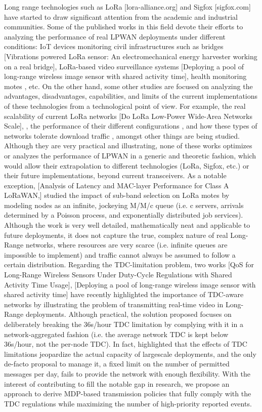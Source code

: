 Long range technologies such as LoRa [lora-alliance.org] and Sigfox [sigfox.com] have started to draw significant attention from the academic and industrial communities.
Some of the published works in this field devote their efforts to analyzing the performance of real LPWAN deployments under different conditions:
	IoT devices monitoring civil infrastructures such as bridges [Vibrations powered LoRa sensor:
	An electromechanical energy harvester working on a real bridge],
	LoRa-based video surveillance systems [Deploying a pool of long-range wireless image sensor with shared activity time],
	health monitoring motes \cite{petajajarvi_evaluation_2017},
	etc.
On the other hand,
	some other studies are focused on analyzing the advantages,
	disadvantages,
	capabilities,
	and limits of the current implementations of these technologies from a technological point of view.
For example,
	the real scalability of current LoRa networks [Do LoRa Low-Power Wide-Area Networks Scale],
	\cite{georgiou_low_2017},
	the performance of their different configurations \cite{bor_lora_2017},
	and how these types of networks tolerate download traffic \cite{pop_does_2017},
	amongst other things are being studied.
Although they are very practical and illustrating,
	none of these works optimizes or analyzes the performance of LPWAN in a generic and theoretic fashion,
	which would allow their extrapolation to different technologies (LoRa,
	Sigfox,
	etc.) or their future implementations,
	beyond current transceivers.
As a notable exception,
	[Analysis of Latency and MAC-layer Performance for Class A LoRaWAN,] studied the impact of sub-band selection on LoRa motes by modeling nodes as an infinite,
	jockeying M/M/c queue (i.e.
c servers,
	arrivals determined by a Poisson process,
	and exponentially distributed job services).
Although the work is very well detailed,
	mathematically neat and applicable to future deployments,
	it does not capture the true,
	complex nature of real Long-Range networks,
	where resources are very scarce (i.e.
infinite queues are impossible to implement) and traffic cannot always be assumed to follow a certain distribution.
Regarding the TDC-limitation problem,
	two works [QoS for Long-Range Wireless Sensors Under Duty-Cycle Regulations with Shared Activity Time Usage],
	[Deploying a pool of long-range wireless image sensor with shared activity time] have recently highlighted the importance of TDC-aware networks by illustrating the problem of transmitting real-time video in Long-Range deployments.
Although practical,
	the solution proposed focuses on deliberately breaking the 36s/hour TDC limitation by complying with it in a network-aggregated fashion (i.e.
the average network TDC is kept below 36s/hour,
	not the per-node TDC).
In fact,
	\cite{adelantado_understanding_2017} highlighted that the effects of TDC limitations jeopardize the actual capacity of largescale deployments,
	and the only de-facto proposal to manage it,
	a fixed limit on the number of permitted messages per day,
	fails to provide the network with enough flexibility.
With the interest of contributing to fill the notable gap in research,
	we propose an approach to derive MDP-based transmission policies that fully comply with the TDC regulations while maximizing the number of high-priority reported events.

